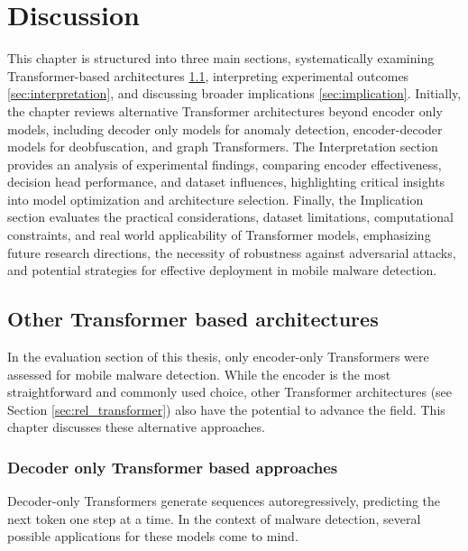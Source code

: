 \chapter{Discussion}

\label{Discussion} %

This chapter is structured into three main sections, systematically examining 
Transformer-based architectures \ref{sec:other_transformer}, 
interpreting experimental outcomes \ref{sec:interpretation}, 
and discussing broader implications  \ref{sec:implication}. 
Initially, the chapter reviews alternative Transformer architectures beyond encoder only models, 
including decoder only models for anomaly detection, 
encoder-decoder models for deobfuscation, and graph Transformers. 
The Interpretation section provides an analysis of experimental findings, comparing encoder effectiveness, 
decision head performance, and dataset influences, 
highlighting critical insights into model optimization and architecture selection. 
Finally, the Implication section evaluates the practical considerations, dataset limitations, computational constraints, 
and real world applicability of Transformer models, emphasizing future research directions, 
the necessity of robustness against adversarial attacks, and potential strategies for effective deployment 
in mobile malware detection.

\section{Other Transformer based architectures}
\label{sec:other_transformer}

In the evaluation section of this thesis, only encoder-only Transformers were assessed for mobile malware detection.
While the encoder is the most straightforward and commonly used choice, other Transformer architectures 
(see Section \ref{sec:rel_transformer}) also have the potential to advance the field.
This chapter discusses these alternative approaches.

\subsection{Decoder only Transformer based approaches}

Decoder-only Transformers generate sequences autoregressively, predicting the next token one step at a time.
In the context of malware detection, several possible applications for these models come to mind.

